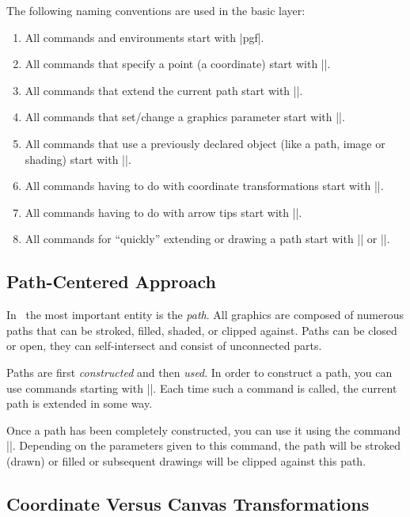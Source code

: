 The following naming conventions are used in the basic layer:

\begin{enumerate}
\item
  All commands and environments start with |pgf|.
\item
  All commands that specify a point (a coordinate) start with |\pgfpoint|.
\item
  All commands that extend the current path start with |\pgfpath|.
\item
  All commands that set/change a graphics parameter start with |\pgfset|.
\item
  All commands that use a previously declared object (like a path,
  image or shading) start with |\pgfuse|.
\item
  All commands having to do with coordinate transformations start with
  |\pgftransform|. 
\item
  All commands having to do with arrow tips start with |\pgfarrows|.
\item
  All commands for ``quickly'' extending or drawing a path start with
  |\pgfpathq| or |\pgfusepathq|.
\end{enumerate}


\subsection{Path-Centered Approach}

In \pgfname\ the most important entity is the \emph{path}. All
graphics are composed of numerous paths that can be stroked,
filled, shaded, or clipped against. Paths can be closed or open, they
can self-intersect and consist of unconnected parts.

Paths are first \emph{constructed} and then \emph{used}. In order to
construct a path, you can use commands starting with |\pgfpath|. Each
time such a command is called, the current path is extended in some
way.

Once a path has been completely constructed, you can use it using the
command |\pgfusepath|. Depending on the parameters given to this
command, the path will be stroked (drawn) or filled or subsequent
drawings will be clipped against this path.




\subsection{Coordinate Versus Canvas Transformations}


